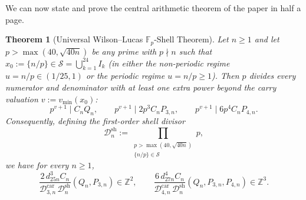 \documentclass[11pt,reqno]{amsart}
\newtheorem{theorem}{Theorem}[section]
\theoremstyle{definition}
\theoremstyle{remark}
\newcommand{\ZZ}{\mathbb{Z}}
\newcommand{\FF}{\mathbb{F}}
\begin{document}
We can now state and prove the central arithmetic theorem of the paper in half a page.

\begin{theorem}[Universal Wilson--Lucas $\FF_p$-Shell Theorem]
\label{thm:wilson-lucas}
Let $n \ge 1$ and let $p > \max(40, \sqrt{40n})$ be any prime with $p \nmid n$ such that $x_0 := \{n/p\} \in \mathcal{S} = \bigcup_{k=1}^{24} I_k$ (in either the non-periodic regime $u = n/p \in (1/25, 1)$ or the periodic regime $u = n/p \ge 1$). Then $p$ divides every numerator and denominator with \emph{at least one extra power} beyond the carry valuation $v := v_{\min}(x_0)$:
\begin{equation}
\label{eq:extra-p}
  p^{v + 1} \mid C_n Q_n,
  \qquad
  p^{v + 1} \mid 2 p^3 C_n P_{3,n},
  \qquad
  p^{v + 1} \mid 6 p^4 C_n P_{4,n}.
\end{equation}
Consequently, defining the first-order shell divisor
\[
  \mathcal{D}_n^{\mathrm{sh}} := \prod_{\substack{p > \max(40, \sqrt{40n}) \\ \{n/p\} \in \mathcal{S}}} p,
\]
we have for every $n \ge 1$,
\begin{equation}
\label{eq:full-int}
  \frac{2\, d_{25n}^3 C_n}{\mathcal{D}_{3,n}^{\mathrm{car}}\,\mathcal{D}_n^{\mathrm{sh}}}(Q_n, P_{3,n}) \in \ZZ^2,
  \qquad
  \frac{6\, d_{27n}^4 C_n}{\mathcal{D}_{4,n}^{\mathrm{car}}\,\mathcal{D}_n^{\mathrm{sh}}}(Q_n, P_{3,n}, P_{4,n}) \in \ZZ^3.
\end{equation}
\end{theorem}
\end{document}
